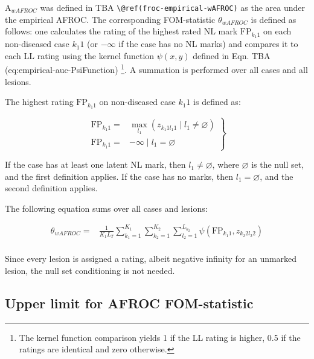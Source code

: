 \documentclass[
]{book}
\begin{document}
\(\text{A}_{wAFROC}\) was defined in TBA \texttt{\textbackslash{}@ref(froc-empirical-wAFROC)} as the area under the empirical AFROC. The corresponding FOM-statistic \(\theta_{wAFROC}\) is defined as follows: one calculates the rating of the highest rated NL mark \(\text{FP}_{k_1 1}\) on each non-diseased case \(k_1 1\) (or \(-\infty\) if the case has no NL marks) and compares it to each LL rating using the kernel function \(\psi(x,y)\) defined in Eqn. TBA (eq:empirical-auc-PsiFunction) \footnote{The kernel function comparison yields 1 if the LL rating is higher, 0.5 if the ratings are identical and zero otherwise.}. A summation is performed over all cases and all lesions.

The highest rating \(\text{FP}_{k_1 1}\) on non-diseased case \(k_1 1\) is defined as:

\begin{equation}
\left.
\begin{aligned}
\text{FP}_{k_1 1}  =&  \max_{l_1} \left ( z_{k_1 1 l_1 1} \mid  l_1 \neq \varnothing \right )\\
\text{FP}_{k_1 1}  =&  -\infty\mid l_1 = \varnothing
\end{aligned}
\right \}
\label{eq:froc-meanings-R-k1}
\end{equation}

If the case has at least one latent NL mark, then \(l_1 \neq \varnothing\), where \(\varnothing\) is the null set, and the first definition applies. If the case has no marks, then \(l_1 = \varnothing\), and the second definition applies.

The following equation sums over all cases and lesions:

\begin{equation}
\begin{aligned} 
\theta_{wAFROC} =& \frac{1}{K_1 L_T}\sum_{k_1=1}^{K_1}\sum_{k_2=1}^{K_2}\sum_{l_2=1}^{L_{k_2}}\psi\left ( \text{FP}_{k_1 1}, z_{k_2 2 l_2 2} \right )\\
\end {aligned}
\label{eq:froc-meanings-theta-afroc}
\end{equation}

Since every lesion is assigned a rating, albeit negative infinity for an unmarked lesion, the null set conditioning is not needed.

\hypertarget{upper-limit-for-afroc-fom-statistic}{%
\subsection{Upper limit for AFROC FOM-statistic}\label{upper-limit-for-afroc-fom-statistic}}
\end{document}
